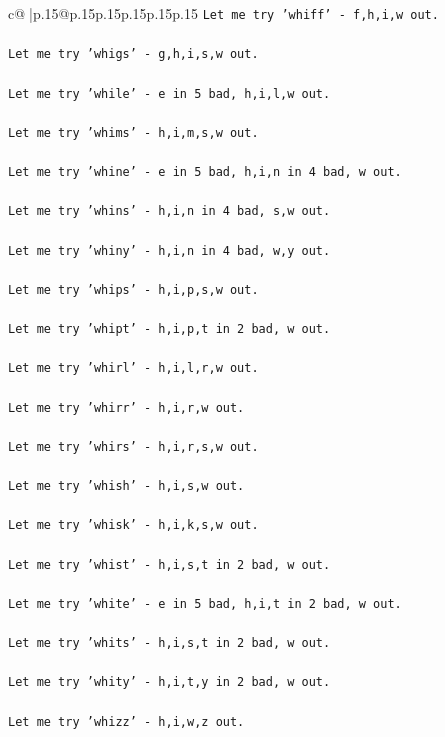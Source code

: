 \documentclass{article}
\begin{document}
{\begin{supertabular}{c@{$\;$}|p{.15\linewidth}@{}p{.15\linewidth}p{.15\linewidth}p{.15\linewidth}p{.15\linewidth}p{.15\linewidth}}
{{{\texttt{Let me try 'whiff' {-} f,h,i,w out. } \\
\\ 
\texttt{Let me try 'whigs' {-} g,h,i,s,w out. } \\
\\ 
\texttt{Let me try 'while' {-} e in 5 bad, h,i,l,w out. } \\
\\ 
\texttt{Let me try 'whims' {-} h,i,m,s,w out. } \\
\\ 
\texttt{Let me try 'whine' {-} e in 5 bad, h,i,n in 4 bad, w out. } \\
\\ 
\texttt{Let me try 'whins' {-} h,i,n in 4 bad, s,w out. } \\
\\ 
\texttt{Let me try 'whiny' {-} h,i,n in 4 bad, w,y out. } \\
\\ 
\texttt{Let me try 'whips' {-} h,i,p,s,w out. } \\
\\ 
\texttt{Let me try 'whipt' {-} h,i,p,t in 2 bad, w out. } \\
\\ 
\texttt{Let me try 'whirl' {-} h,i,l,r,w out. } \\
\\ 
\texttt{Let me try 'whirr' {-} h,i,r,w out. } \\
\\ 
\texttt{Let me try 'whirs' {-} h,i,r,s,w out. } \\
\\ 
\texttt{Let me try 'whish' {-} h,i,s,w out. } \\
\\ 
\texttt{Let me try 'whisk' {-} h,i,k,s,w out. } \\
\\ 
\texttt{Let me try 'whist' {-} h,i,s,t in 2 bad, w out. } \\
\\ 
\texttt{Let me try 'white' {-} e in 5 bad, h,i,t in 2 bad, w out. } \\
\\ 
\texttt{Let me try 'whits' {-} h,i,s,t in 2 bad, w out. } \\
\\ 
\texttt{Let me try 'whity' {-} h,i,t,y in 2 bad, w out. } \\
\\ 
\texttt{Let me try 'whizz' {-} h,i,w,z out. } \\
}}}
\end{supertabular}}
\end{document}
